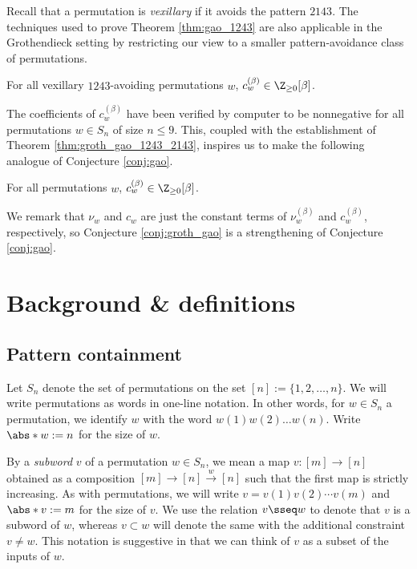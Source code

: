 Recall that a permutation is \textit{vexillary} if it avoids the pattern $2143$.
The techniques used to prove Theorem \ref{thm:gao_1243} are also applicable in the Grothendieck setting by restricting our view to a smaller pattern-avoidance class of permutations.
\begin{theorem}
\label{thm:groth_gao_1243_2143}
    For all vexillary $1243$-avoiding permutations $w$,
    $c^{(\beta)}_w \in \Z_{\geq0}[\beta]$.
\end{theorem}

The coefficients of $c^{(\beta)}_w$ have been verified by computer to be nonnegative for all permutations $w\in S_n$ of size $n\leq 9$.
This, coupled with the establishment of Theorem \ref{thm:groth_gao_1243_2143},
inspires us to make the following analogue of Conjecture \ref{conj:gao}.
\begin{conjecture}
\label{conj:groth_gao}
    For all permutations $w$, $c^{(\beta)}_w \in \Z_{\geq0}[\beta]$.
\end{conjecture}
We remark that $\nu_w$ and $c_w$ are just the constant terms of $\nu^{(\beta)}_w$ and $c^{(\beta)}_w$, respectively, so Conjecture \ref{conj:groth_gao} is a strengthening of Conjecture \ref{conj:gao}.





\section{Background \& definitions}

\subsection{Pattern containment}
\label{sect:pat}

Let $S_n$ denote the set of permutations on the set $[n] := \{1,2,\dots,n\}$.
We will write permutations as words in one-line notation.
In other words, for $w\in S_n$ a permutation, we identify $w$ with the word $w(1)w(2)\dots w(n)$.
Write $\abs*{w} := n$ for the size of $w$.

By a \textit{subword} $v$ of a permutation $w\in S_n$, we mean a map $v\colon [m]\to [n]$ obtained as a composition $[m]\to [n]\overset w\to [n]$ such that the first map is strictly increasing.
As with permutations, we will write $v = v(1)v(2)\cdots v(m)$ and $\abs*{v} := m$ for the size of $v$.
We use the relation $v\sseq w$ to denote that $v$ is a subword of $w$, whereas $v\subset w$ will denote the same with the additional constraint $v\neq w$.
This notation is suggestive in that we can think of $v$ as a subset of the inputs of $w$.

